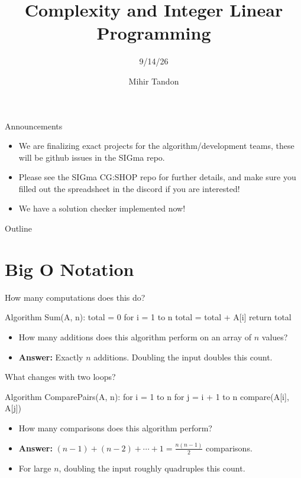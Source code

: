 \documentclass[aspectratio=169]{beamer}
\title{Complexity and Integer Linear Programming}
\subtitle{9/14/26}
\author{Mihir Tandon}
\begin{document}
\begin{frame}\titlepage\end{frame}

\begin{frame}{Announcements}
\begin{itemize}
  \item We are finalizing exact projects for the algorithm/development teams, these will be github issues in the SIGma repo.
  \item Please see the SIGma CG:SHOP repo for further details, and make sure you filled out the spreadsheet in the discord if you are interested!
  \item We have a solution checker implemented now!
\end{itemize}
\end{frame}

\begin{frame}{Outline}
\tableofcontents
\end{frame}

\section{Big O Notation}
\frame{\sectionpage}
\begin{frame}[fragile]{How many computations does this do?}
\begin{pycode}
Algorithm Sum(A, n):
    total = 0
    for i = 1 to n
        total = total + A[i]
    return total
\end{pycode}
\begin{itemize}
\item How many additions does this algorithm perform on an array of $n$ values?
\pause
\item \textbf{Answer:} Exactly $n$ additions. Doubling the input doubles this count.
\end{itemize}
\end{frame}

\begin{frame}[fragile]{What changes with two loops?}
\begin{pycode}
Algorithm ComparePairs(A, n):
    for i = 1 to n
        for j = i + 1 to n
            compare(A[i], A[j])
\end{pycode}
\begin{itemize}
\item How many comparisons does this algorithm perform?
\pause
\item \textbf{Answer:} $(n-1)+(n-2)+\cdots+1=\frac{n(n-1)}{2}$ comparisons.
\pause
\item For large $n$, doubling the input roughly quadruples this count.
\end{itemize}
\end{frame}
\end{document}
